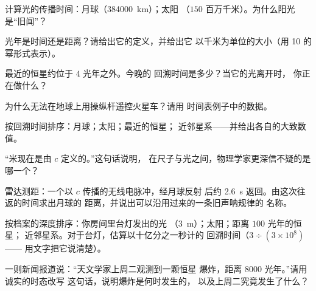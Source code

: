 \begin{exercise}[$\star$]\label{exo:g8:speed-of-light:3}
计算光的传播时间：月球（\qty{384000}{km}）；太阳
（$150$ 百万千米）。为什么阳光是“旧闻”？
\end{exercise}

\begin{exercise}[$\star$]\label{exo:g8:speed-of-light:4}
光年是时间还是距离？请给出它的定义，并给出它
以千米为单位的大小（用 10 的幂形式表示）。
\end{exercise}

\begin{exercise}[$\star$]\label{exo:g8:speed-of-light:5}
最近的恒星约位于 $4$ 光年之外。今晚的
回溯时间是多少？当它的光离开时，
你正在做什么？
\end{exercise}

\begin{exercise}[$\star$]\label{exo:g8:speed-of-light:6}
为什么无法在地球上用操纵杆遥控火星车？请用
时间表例子中的数据。
\end{exercise}

\begin{exercise}[$\star$]\label{exo:g8:speed-of-light:7}
按回溯时间排序：月球；太阳；最近的恒星；
近邻星系——并给出各自的大致数值。
\end{exercise}

\begin{exercise}[$\star$]\label{exo:g8:speed-of-light:8}
“米现在是由 $c$ 定义的。”这句话说明，
在尺子与光之间，物理学家更深信不疑的是
哪一个？
\end{exercise}

\begin{exercise}[$\star\star$]\label{exo:g8:speed-of-light:9}
雷达测距：一个以 $c$ 传播的无线电脉冲，经月球反射
后约 \qty{2.6}{s} 返回。由这次往返的时间求出月球的
距离，并说出可以沿用过来的一条旧声呐规律的
名称。
\end{exercise}

\begin{exercise}[$\star\star$]\label{exo:g8:speed-of-light:10}
按档案的深度排序：你房间里台灯发出的光
（\qty{3}{m}）；太阳；距离 $100$ 光年的恒星；
近邻星系。对于台灯，估算以十亿分之一秒计的
回溯时间（$3 \div (3 \times 10^{8})$——
用文字把它说清楚）。
\end{exercise}

\begin{exercise}[$\star\star$]\label{exo:g8:speed-of-light:11}
一则新闻报道说：“天文学家上周二观测到一颗恒星
爆炸，距离 $8000$ 光年。”请用诚实的时态改写
这句话，说明爆炸是何时发生的，
以及上周二究竟发生了什么？
\end{exercise}

